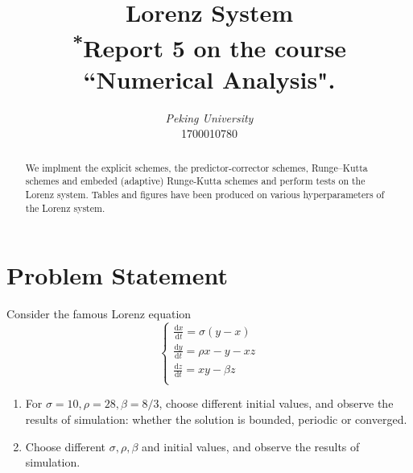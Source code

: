 \documentclass[conference,onecolumn,12pt]{IEEEtran}
\renewcommand{\d}{\mathrm{d}}
\begin{document}
\title{{Lorenz System}\\
{\footnotesize \textsuperscript{*}Report 5 on the course ``Numerical Analysis".}
}

\author{
\textit{Peking University}\\
1700010780}

\maketitle
\thispagestyle{fancy} %
\lhead{} %
\chead{} %
\rhead{} %
\lfoot{} %
\cfoot{} %
\cfoot{\thepage} %
\renewcommand{\headrulewidth}{0pt} %
\renewcommand{\footrulewidth}{1pt} %
\pagestyle{fancy}
\cfoot{\thepage}

\begin{abstract}
    We implment the explicit schemes, the predictor-corrector schemes, Runge–Kutta schemes and embeded (adaptive) Runge-Kutta schemes and perform tests on the Lorenz system. Tables and figures have been produced on various hyperparameters of the Lorenz system.
\end{abstract}

\tableofcontents

\clearpage
\section{Problem Statement}
Consider the famous Lorenz equation
\begin{equation}
\begin{cases}
    \frac{\d x}{\d t}=\sigma(y-x)\\
    \frac{\d y}{\d t} = \rho x-y -xz\\
    \frac{\d z}{\d t} = xy-\beta z\\
\end{cases}
\end{equation}
\begin{enumerate}
    \item For $\sigma = 10, \rho=28, \beta=8/3$, choose different initial values, and observe the results of simulation: whether the solution is bounded, periodic or converged.\\
    \item Choose different $\sigma, \rho, \beta$ and initial values, and observe the results of simulation.
\end{enumerate}
\end{document}
